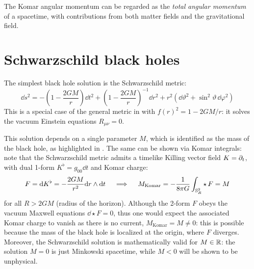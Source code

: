 The Komar angular momentum can be regarded as the \emph{total angular momentum} of a spacetime, with contributions from both matter fields and the gravitational field.















































\newpage
\section{Schwarzschild black holes}
\label{sec:bh-schwarzschild}


The simplest black hole solution is the Schwarzschild metric:
\begin{equation}
  \dd s^2 = - \left( 1 - \frac{2GM}{r} \right) \dd t^2 + \left( 1 - \frac{2GM}{r} \right)^{-1} \dd r^2 + r^2 \left( \dd \vartheta^2 + \sin^2 \vartheta\, \dd \varphi^2 \right)
  \label{eq:schw-metric}
\end{equation}
This is a special case of the general metric in  with $ f(r)^2 = 1 - 2GM / r $: it solves the vacuum Einstein equations $ R_{\mu \nu} = 0 $.

This solution depends on a single parameter $ M $, which is identified as the mass of the black hole, as highlighted in . The same can be shown via Komar integrals: note that the Schwarzschild metric admits a timelike Killing vector field $ K = \partial_t $, with dual 1-form $ K^\flat = g_{00} \dd t $ and Komar charge:
\begin{equation*}
  F = \mathrm{d} K^\flat = - \frac{2GM}{r^2} \mathrm{d} r \wedge \mathrm{d} t
  \quad \implies \quad
  M_{\text{Komar}} = - \frac{1}{8\pi G} \int_{\mathbb{S}^{2}_R} \star\, F = M
\end{equation*}
for all $ R > 2GM $ (radius of the horizon). Although the 2-form $ F $ obeys the vacuum Maxwell equations $ \dd \star F = 0 $, thus one would expect the associated Komar charge to vanish as there is no current, $ M_{\text{Komar}} = M \neq 0 $: this is possible because the mass of the black hole is localized at the origin, where $ F $ diverges. Moreover, the Schwarzschild solution is mathematically valid for $ M \in \mathbb{R} $: the solution $ M = 0 $ is just Minkowski spacetime, while $ M < 0 $ will be shown to be unphysical.

